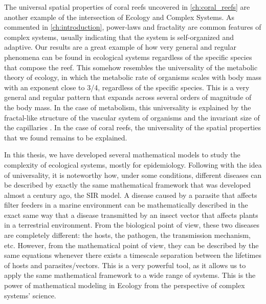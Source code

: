 The universal spatial properties of coral reefs uncovered in
\cref*{ch:coral_reefs} are another example of the intersection of Ecology and
Complex Systems. As commented in \cref{ch:introduction}, power-laws and
fractality are common features of complex systems, usually indicating that the
system is self-organized and adaptive. Our results are a great example of how
very general and regular phenomena can be found in ecological systems
regardless of the specific species that compose the reef. This somehow
resembles the universality of the metabolic theory of ecology, in which the
metabolic rate of organisms scales with body mass with an exponent close to
3/4, regardless of the specific species. This is a very general and regular
pattern that expands across several orders of magnitude of the body mass. In
the case of metabolism, this universality is explained by the fractal-like
structure of the vascular system of organisms and the invariant size of the
capillaries \cite{West1997}. In the case of coral reefs, the universality of
the spatial properties that we found remains to be explained.


In this thesis, we have developed several mathematical models to study the
complexity of ecological systems, mostly for epidemiology. Following with the
idea of universality, it is noteworthy how, under some conditions, different
diseases can be described by exactly the same mathematical framework that was
developed almost a century ago, the SIR model. A disease caused by a parasite
that affects filter feeders in a marine environment can be mathematically
described in the exact same way that a disease transmitted by an insect vector
that affects plants in a terrestrial environment. From the biological point of
view, these two diseases are completely different: the hosts, the pathogen, the
transmission mechanism, etc. However, from the mathematical point of view,
they can be described by the same equations whenever there exists a timescale
separation between the lifetimes of hosts and parasites/vectors. This is a very
powerful tool, as it allows us to apply the same mathematical framework to a
wide range of systems. This is the power of mathematical modeling in Ecology
from the perspective of complex systems' science.

